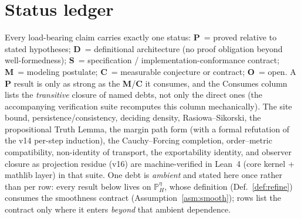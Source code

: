\documentclass[11pt]{article}
\theoremstyle{definition}
\theoremstyle{remark}
\newcommand{\PHeta}{\mathbb{P}_{H}^{\eta}}
\begin{document}
\section{Status ledger}\label{sec:ledger}

Every load-bearing claim carries exactly one status: \textbf{P}~= proved relative to stated
hypotheses; \textbf{D}~= definitional architecture (no proof obligation beyond well-formedness);
\textbf{S}~= specification / implementation-conformance contract; \textbf{M}~= modeling postulate;
\textbf{C}~= measurable conjecture or contract; \textbf{O}~= open. A \textbf{P} result is only as
strong as the \textbf{M}/\textbf{C} it consumes, and the Consumes column lists the \emph{transitive}
closure of named debts, not only the direct ones (the accompanying verification suite recomputes
this column mechanically). The site bound, persistence/consistency, deciding density,
Rasiowa--Sikorski, the propositional Truth Lemma, the margin path form (with a formal refutation of
the v14 per-step induction), the Cauchy--Forcing completion, order--metric compatibility,
non-identity of transport, the exportability identity, and observer closure as projection residue
(v16) are machine-verified in Lean~4 (core
kernel + mathlib layer) in that suite. One debt is \emph{ambient} and stated here once rather than per row:
every result below lives on $\PHeta$, whose definition (Def.~\ref{def:refine}) consumes the
smoothness contract (Assumption~\ref{asm:smooth}); rows list the contract only where it enters
\emph{beyond} that ambient dependence.
\end{document}
